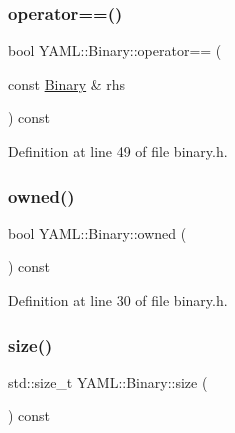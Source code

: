 \mbox{\label{class_y_a_m_l_1_1_binary_a6696e8d22d09dcc1bab30fe257b5db36}} 
\subsubsection{\texorpdfstring{operator==()}{operator==()}}
{\footnotesize\ttfamily bool Y\+A\+M\+L\+::\+Binary\+::operator== (\begin{DoxyParamCaption}\item[{const \mbox{\hyperlink{class_y_a_m_l_1_1_binary}{Binary}} \&}]{rhs }\end{DoxyParamCaption}) const\hspace{0.3cm}{\ttfamily [inline]}}



Definition at line 49 of file binary.\+h.

\mbox{\label{class_y_a_m_l_1_1_binary_aef431ce07caa242dce5041d7a1665c51}} 
\subsubsection{\texorpdfstring{owned()}{owned()}}
{\footnotesize\ttfamily bool Y\+A\+M\+L\+::\+Binary\+::owned (\begin{DoxyParamCaption}{ }\end{DoxyParamCaption}) const\hspace{0.3cm}{\ttfamily [inline]}}



Definition at line 30 of file binary.\+h.

\mbox{\label{class_y_a_m_l_1_1_binary_ad8e9df84af8d99b005992163aeb6c956}} 
\subsubsection{\texorpdfstring{size()}{size()}}
{\footnotesize\ttfamily std\+::size\+\_\+t Y\+A\+M\+L\+::\+Binary\+::size (\begin{DoxyParamCaption}{ }\end{DoxyParamCaption}) const\hspace{0.3cm}{\ttfamily [inline]}}



